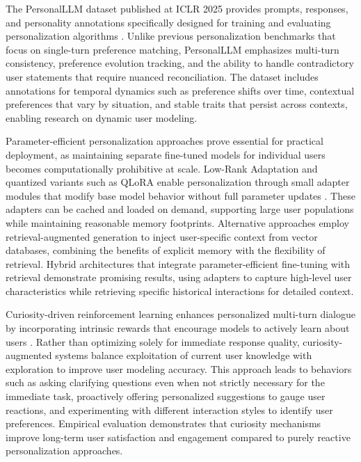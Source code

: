 The PersonalLLM dataset published at ICLR 2025 provides prompts, responses, and personality annotations specifically designed for training and evaluating personalization algorithms \citep{wang2025personalllm}. Unlike previous personalization benchmarks that focus on single-turn preference matching, PersonalLLM emphasizes multi-turn consistency, preference evolution tracking, and the ability to handle contradictory user statements that require nuanced reconciliation. The dataset includes annotations for temporal dynamics such as preference shifts over time, contextual preferences that vary by situation, and stable traits that persist across contexts, enabling research on dynamic user modeling.

Parameter-efficient personalization approaches prove essential for practical deployment, as maintaining separate fine-tuned models for individual users becomes computationally prohibitive at scale. Low-Rank Adaptation and quantized variants such as QLoRA enable personalization through small adapter modules that modify base model behavior without full parameter updates \citep{together2024finetune}. These adapters can be cached and loaded on demand, supporting large user populations while maintaining reasonable memory footprints. Alternative approaches employ retrieval-augmented generation to inject user-specific context from vector databases, combining the benefits of explicit memory with the flexibility of retrieval. Hybrid architectures that integrate parameter-efficient fine-tuning with retrieval demonstrate promising results, using adapters to capture high-level user characteristics while retrieving specific historical interactions for detailed context.

Curiosity-driven reinforcement learning enhances personalized multi-turn dialogue by incorporating intrinsic rewards that encourage models to actively learn about users \citep{zhang2024curiosity}. Rather than optimizing solely for immediate response quality, curiosity-augmented systems balance exploitation of current user knowledge with exploration to improve user modeling accuracy. This approach leads to behaviors such as asking clarifying questions even when not strictly necessary for the immediate task, proactively offering personalized suggestions to gauge user reactions, and experimenting with different interaction styles to identify user preferences. Empirical evaluation demonstrates that curiosity mechanisms improve long-term user satisfaction and engagement compared to purely reactive personalization approaches.

